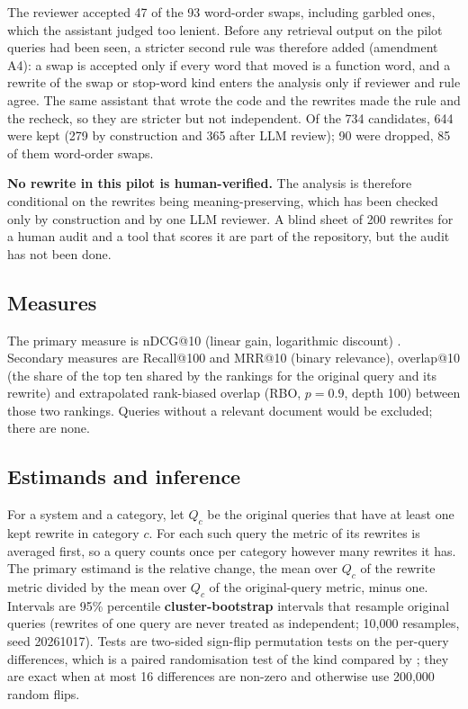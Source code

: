 \documentclass[
  11pt,
]{article}
\begin{document}
The reviewer accepted 47 of the 93 word-order swaps, including garbled
ones, which the assistant judged too lenient. Before any retrieval
output on the pilot queries had been seen, a stricter second rule was
therefore added (amendment A4): a swap is accepted only if every word
that moved is a function word, and a rewrite of the swap or stop-word
kind enters the analysis only if reviewer and rule agree. The same
assistant that wrote the code and the rewrites made the rule and the
recheck, so they are stricter but not independent. Of the 734
candidates, 644 were kept (279 by construction and 365 after LLM
review); 90 were dropped, 85 of them word-order swaps.

\textbf{No rewrite in this pilot is human-verified.} The analysis is
therefore conditional on the rewrites being meaning-preserving, which
has been checked only by construction and by one LLM reviewer. A blind
sheet of 200 rewrites for a human audit and a tool that scores it are
part of the repository, but the audit has not been done.

\hypertarget{measures}{%
\subsection{Measures}\label{measures}}

The primary measure is nDCG@10 (linear gain, logarithmic discount)
\citep{jarvelin2002}. Secondary measures are Recall@100 and MRR@10
(binary relevance), overlap@10 (the share of the top ten shared by the
rankings for the original query and its rewrite) and extrapolated
rank-biased overlap (RBO, \(p = 0.9\), depth 100) \citep{webber2010}
between those two rankings. Queries without a relevant document would be
excluded; there are none.

\hypertarget{estimands-and-inference}{%
\subsection{Estimands and inference}\label{estimands-and-inference}}

For a system and a category, let \(Q_c\) be the original queries that
have at least one kept rewrite in category \(c\). For each such query
the metric of its rewrites is averaged first, so a query counts once per
category however many rewrites it has. The primary estimand is the
relative change, the mean over \(Q_c\) of the rewrite metric divided by
the mean over \(Q_c\) of the original-query metric, minus one. Intervals
are 95\% percentile \textbf{cluster-bootstrap} intervals that resample
original queries (rewrites of one query are never treated as
independent; 10,000 resamples, seed 20261017). Tests are two-sided
sign-flip permutation tests on the per-query differences, which is a
paired randomisation test of the kind compared by \citet{smucker2007};
they are exact when at most 16 differences are non-zero and otherwise
use 200,000 random flips.
\end{document}
